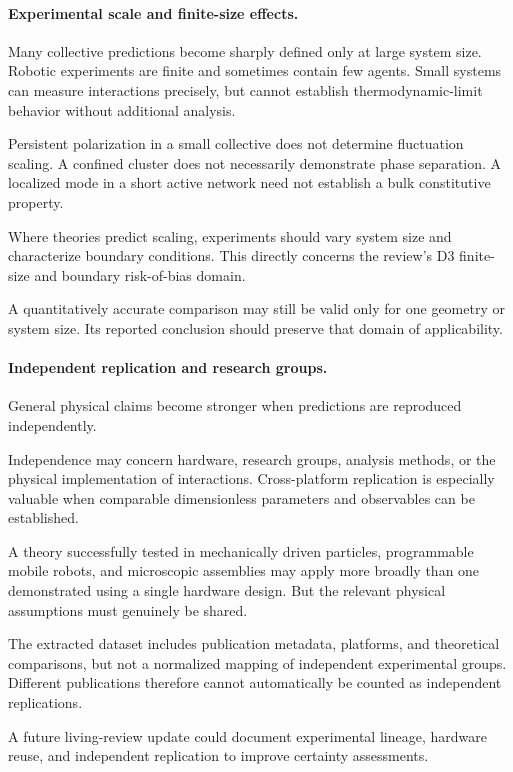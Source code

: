 \paragraph*{Experimental scale and finite-size effects.}

Many collective predictions become
sharply defined only at large system size.
Robotic experiments are finite and
sometimes contain few agents.
Small systems can measure interactions
precisely, but cannot establish
thermodynamic-limit behavior
without additional analysis.

Persistent polarization in a small
collective does not determine
fluctuation scaling. A confined
cluster does not necessarily
demonstrate phase separation.
A localized mode in a short
active network need not establish
a bulk constitutive property.

Where theories predict scaling,
experiments should vary system size
and characterize boundary conditions.
This directly concerns the review's
D3 finite-size and boundary
risk-of-bias domain.

A quantitatively accurate comparison
may still be valid only for one
geometry or system size. Its
reported conclusion should preserve
that domain of applicability.

\paragraph*{Independent replication and research groups.}

General physical claims become
stronger when predictions are
reproduced independently.

Independence may concern hardware,
research groups, analysis methods,
or the physical implementation
of interactions. Cross-platform
replication is especially valuable
when comparable dimensionless
parameters and observables
can be established.

A theory successfully tested in
mechanically driven particles,
programmable mobile robots,
and microscopic assemblies
may apply more broadly than
one demonstrated using
a single hardware design.
But the relevant physical
assumptions must genuinely
be shared.

The extracted dataset includes
publication metadata, platforms,
and theoretical comparisons,
but not a normalized mapping
of independent experimental groups.
Different publications therefore
cannot automatically be counted
as independent replications.

A future living-review update
could document experimental
lineage, hardware reuse,
and independent replication
to improve certainty assessments.

